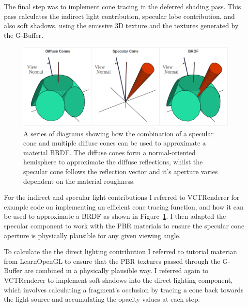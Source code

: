 \documentclass[]{acmsiggraph}
\begin{document}
The final step was to implement cone tracing in the deferred shading pass. This pass calculates the indirect light contribution, specular lobe contribution, and also soft shadows, using the emissive 3D texture and the textures generated by the G-Buffer.

\begin{figure}[htbp]\centering
\includegraphics[width=1.0\linewidth]{images/BRDF}
\caption{\label{figure:BRDF} A series of diagrams showing how the combination of a specular cone and multiple diffuse cones can be used to approximate a material BRDF. \protect\cite{Villegas2016} The diffuse cones form a normal-oriented hemisphere to approximate the diffuse reflections, whilst the specular cone follows the reflection vector and it's aperture varies dependent on the material roughness.}
\end{figure}

For the indirect and specular light contributions I referred to VCTRenderer \cite{Villegas2016} for example code on implementing an efficient cone tracing function, and how it can be used to approximate a BRDF as shown in Figure~\ref{figure:BRDF}. I then adapted the specular component to work with the PBR materials to ensure the specular cone aperture is physically plausible for any given viewing angle.

To calculate the the direct lighting contribution I referred to tutorial materian from LearnOpenGL \cite{learnPBR} to ensure that the PBR textures passed through the G-Buffer are combined in a physically plausible way. I referred again to VCTRenderer \cite{Villegas2016} to implement soft shadows into the direct lighting component, which involves calculating a fragment's occlusion by tracing a cone back towards the light source and accumulating the opacity values at each step.
\end{document}
